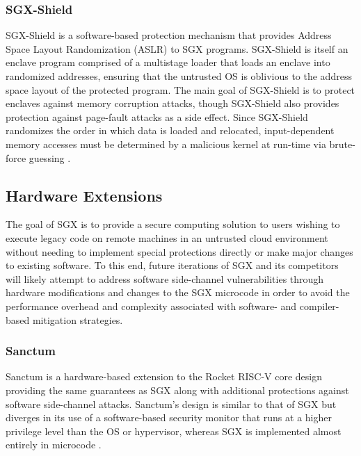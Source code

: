 \subsubsection{SGX-Shield}

SGX-Shield is a software-based protection mechanism that provides Address Space Layout Randomization (ASLR) to SGX programs. SGX-Shield is itself an enclave program comprised of a multistage loader that loads an enclave into randomized addresses, ensuring that the untrusted OS is oblivious to the address space layout of the protected program. The main goal of SGX-Shield is to protect enclaves against memory corruption attacks, though SGX-Shield also provides protection against page-fault attacks as a side effect. Since SGX-Shield randomizes the order in which data is loaded and relocated, input-dependent memory accesses must be determined by a malicious kernel at run-time via brute-force guessing \cite{seo_sgx-shield:_2017}. 

\subsection{Hardware Extensions}

The goal of SGX is to provide a secure computing solution to users wishing to execute legacy code on remote machines in an untrusted cloud environment without needing to implement special protections directly or make major changes to existing software. To this end, future iterations of SGX and its competitors will likely attempt to address software side-channel vulnerabilities through hardware modifications and changes to the SGX microcode in order to avoid the performance overhead and complexity associated with software- and compiler-based mitigation strategies. 

\subsubsection{Sanctum}

Sanctum is a hardware-based extension to the Rocket RISC-V core design providing the same guarantees as SGX along with additional protections against software side-channel attacks. Sanctum's design is similar to that of SGX but diverges in its use of a software-based security monitor that runs at a higher privilege level than the OS or hypervisor, whereas SGX is implemented almost entirely in microcode \cite{intel_corporation_intel_2016, costan_intel_2016, costan_sanctum:_2016, costan_sanctum:_2015}. 

